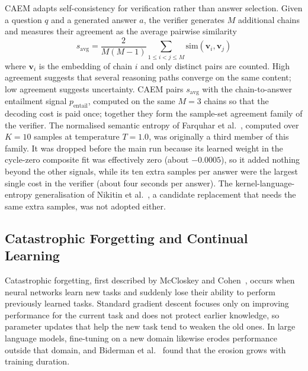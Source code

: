 CAEM adapts self-consistency for verification rather than answer selection. Given a question $q$ and a generated answer $a$, the verifier generates $M$ additional chains and measures their agreement as the average pairwise similarity
\begin{equation}
s_{\text{avg}} = \frac{2}{M(M-1)} \sum_{1 \le i < j \le M} \text{sim}(\mathbf{v}_i, \mathbf{v}_j)
\end{equation}
where $\mathbf{v}_i$ is the embedding of chain $i$ and only distinct pairs are counted. High agreement suggests that several reasoning paths converge on the same content; low agreement suggests uncertainty. CAEM pairs $s_{\text{avg}}$ with the chain-to-answer entailment signal $p_{\text{entail}}$, computed on the same $M{=}3$ chains so that the decoding cost is paid once; together they form the sample-set agreement family of the verifier. The normalised semantic entropy of Farquhar et al.~\cite{farquhar2024semantic}, computed over $K{=}10$ samples at temperature $T{=}1.0$, was originally a third member of this family. It was dropped before the main run because its learned weight in the cycle-zero composite fit was effectively zero (about $-0.0005$), so it added nothing beyond the other signals, while its ten extra samples per answer were the largest single cost in the verifier (about four seconds per answer). The kernel-language-entropy generalisation of Nikitin et al.~\cite{nikitin2024kle}, a candidate replacement that needs the same extra samples, was not adopted either.

\subsection{Catastrophic Forgetting and Continual Learning}

Catastrophic forgetting, first described by McCloskey and Cohen~\cite{MCCLOSKEY1989109}, occurs when neural networks learn new tasks and suddenly lose their ability to perform previously learned tasks. Standard gradient descent focuses only on improving performance for the current task and does not protect earlier knowledge, so parameter updates that help the new task tend to weaken the old ones. In large language models, fine-tuning on a new domain likewise erodes performance outside that domain, and Biderman et al.~\cite{biderman2024lora} found that the erosion grows with training duration.


